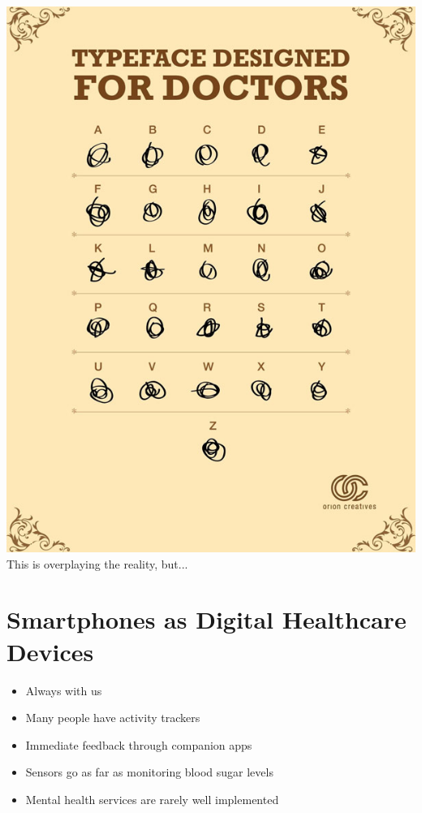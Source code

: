 \documentclass[xcolor=dvipsnames, aspectratio=1610]{beamer}
\begin{document}
\begin{frame}{\secname}
    \centering
    \includegraphics[height=0.8\textheight]{../media/doctor_handwriting.jpg} \\
    \small{This is overplaying the reality, but... \cite{docHandwriting}}
\end{frame}

\section{Smartphones as Digital Healthcare Devices}%
\label{sec:smartphones_as_digital_healthcare_devices}

\begin{frame}{\secname}
    \begin{itemize}[<+->]
        \item Always with us
        \item Many people have activity trackers
        \item Immediate feedback through companion apps
        \item Sensors go as far as monitoring blood sugar levels \cite{glucoseTracker}
        \item Mental health services are rarely well implemented \cite{torous2017needed}
    \end{itemize}
\end{frame}
\end{document}
